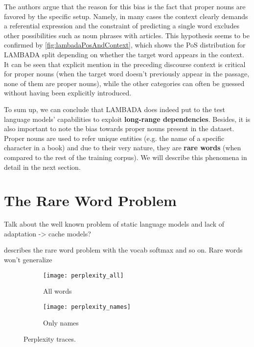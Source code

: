The authors argue that the reason for this bias is the fact that proper nouns are favored by the specific setup. Namely, in many cases the context clearly demands a referential expression and the constraint of predicting a single word excludes other possibilities such as noun phrases with articles. This hypothesis seems to be confirmed by \autoref{fig:lambadaPosAndContext}, which shows the PoS distribution for LAMBADA split depending on whether the target word appears in the context. It can be seen that explicit mention in the preceding discourse context is critical for proper nouns (when the target word doesn't previously appear in the passage, none of them are proper nouns), while the other categories can often be guessed without having been explicitly introduced.

To sum up, we can conclude that LAMBADA does indeed put to the test language models' capabilities to exploit \textbf{long-range dependencies}. Besides, it is also important to note the bias towards proper nouns present in the dataset. Proper nouns are used to refer unique entities (e.g. the name of a specific character in a book) and due to their very nature, they are \textbf{rare words} (when compared to the rest of the training corpus). We will describe this phenomena in detail in the next section.

\section{The Rare Word Problem}
\label{sec:problemRare}

Talk about the well known problem of static language models and lack of adaptation -> cache models?

\cite{gulcehre2016pointing} describes the rare word problem with the vocab softmax and so on. Rare words won't generalize

\begin{figure}[H]
	\centering
	\begin{subfigure}{.5\textwidth}
		\centering
		\texttt{[image: perplexity\_all]}
		\caption{All words}
		\label{fig:perplexity_all}
	\end{subfigure}%
	\begin{subfigure}{.5\textwidth}
		\centering
		\texttt{[image: perplexity\_names]}
		\caption{Only names}
		\label{fig:perplexity_names}
	\end{subfigure}
	\caption{Perplexity traces.}
	\label{fig:perplexity}
\end{figure}

